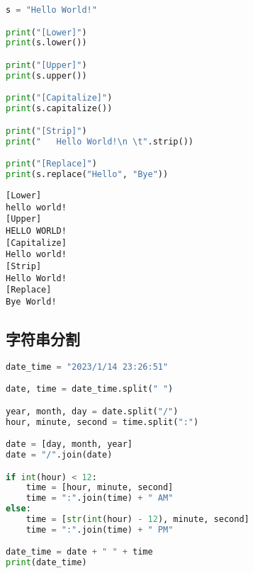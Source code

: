 
\begin{lstlisting}[language=Python]
s = "Hello World!"

print("[Lower]")
print(s.lower())

print("[Upper]")
print(s.upper())

print("[Capitalize]")
print(s.capitalize())

print("[Strip]")
print("   Hello World!\n \t".strip())

print("[Replace]")
print(s.replace("Hello", "Bye"))
\end{lstlisting}

\begin{tcolorbox}
	\begin{verbatim}
[Lower]
hello world!
[Upper]     
HELLO WORLD!
[Capitalize]
Hello world!
[Strip]     
Hello World!
[Replace]
Bye World!
\end{verbatim}
\end{tcolorbox}

\vspace{0.5cm}

\subsection{字符串分割}

\begin{table}[H]
	\centering
\end{table}


\begin{lstlisting}[language=Python]
date_time = "2023/1/14 23:26:51"

date, time = date_time.split(" ")

year, month, day = date.split("/")
hour, minute, second = time.split(":")

date = [day, month, year]
date = "/".join(date)

if int(hour) < 12:
	time = [hour, minute, second]
	time = ":".join(time) + " AM"
else:
	time = [str(int(hour) - 12), minute, second]
	time = ":".join(time) + " PM"

date_time = date + " " + time
print(date_time)
\end{lstlisting}

